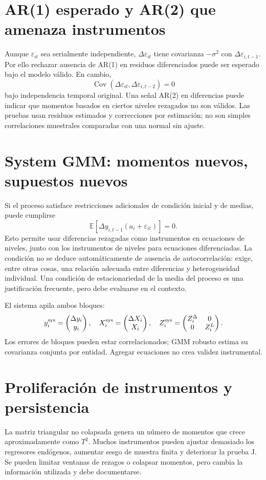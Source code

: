 \documentclass[11pt,a4paper]{article}
\newcommand{\E}{\mathbb E}
\DeclareMathOperator{\Cov}{Cov}
\theoremstyle{definition}
\newcommand{\eps}{\varepsilon}
\begin{document}
\section{AR(1) esperado y AR(2) que amenaza instrumentos}
Aunque $\eps_{it}$ sea serialmente independiente,
$\Delta\eps_{it}$ tiene covarianza $-\sigma^2$ con $\Delta\eps_{i,t-1}$.
Por ello rechazar ausencia de AR(1) en residuos diferenciados puede ser esperado bajo el modelo válido.
En cambio,
\[
\Cov(\Delta\eps_{it},\Delta\eps_{i,t-2})=0
\]
bajo independencia temporal original.
Una señal AR(2) en diferencias puede indicar que momentos basados en ciertos niveles rezagados no son válidos.
Las pruebas usan residuos estimados y correcciones por estimación; no son simples correlaciones muestrales comparadas con una normal sin ajuste.

\section{System GMM: momentos nuevos, supuestos nuevos}
Si el proceso satisface restricciones adicionales de condición inicial y de medias, puede cumplirse
\[
\E[\Delta y_{i,t-1}(a_i+\eps_{it})]=0.
\]
Esto permite usar diferencias rezagadas como instrumentos en ecuaciones de niveles, junto con los instrumentos de niveles para ecuaciones diferenciadas.
La condición no se deduce automáticamente de ausencia de autocorrelación: exige, entre otras cosas, una relación adecuada entre diferencias y heterogeneidad individual.
Una condición de estacionariedad de la media del proceso es una justificación frecuente, pero debe evaluarse en el contexto.

El sistema apila ambos bloques:
\[
y_i^{\rm sys}=\begin{pmatrix}\Delta y_i\\y_i\end{pmatrix},
\quad
X_i^{\rm sys}=\begin{pmatrix}\Delta X_i\\X_i\end{pmatrix},
\quad
Z_i^{\rm sys}=\begin{pmatrix}Z_i^\Delta&0\\0&Z_i^L\end{pmatrix}.
\]
Los errores de bloques pueden estar correlacionados; GMM robusto estima su covarianza conjunta por entidad. Agregar ecuaciones no crea validez instrumental.

\section{Proliferación de instrumentos y persistencia}
La matriz triangular no colapsada genera un número de momentos que crece aproximadamente como $T^2$.
Muchos instrumentos pueden ajustar demasiado los regresores endógenos, aumentar sesgo de muestra finita y deteriorar la prueba J.
Se pueden limitar ventanas de rezagos o colapsar momentos, pero cambia la información utilizada y debe documentarse.
\end{document}
